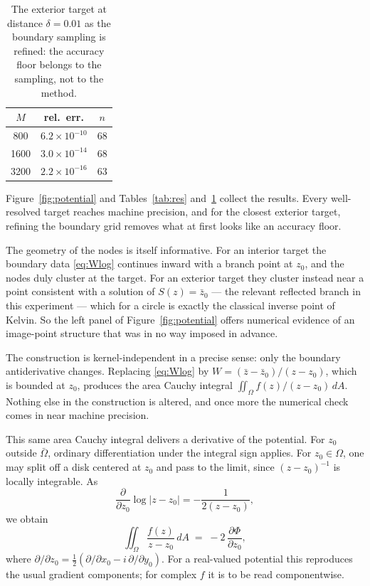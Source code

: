 \documentclass[onefignum,onetabnum]{siamart220329}
\newcommand{\dA}{\,dA}
\begin{document}
\begin{table}[t]
\centering
\caption{The exterior target at distance $\delta = 0.01$ as the
boundary sampling is refined: the accuracy floor belongs to the
sampling, not to the method.}
\label{tab:resM}
\begin{tabular}{ccc}
\toprule
$M$ & rel.\ err. & $n$\\
\midrule
800  & $6.2\times 10^{-10}$ & 68\\
1600 & $3.0\times 10^{-14}$ & 68\\
3200 & $2.2\times 10^{-16}$ & 63\\
\bottomrule
\end{tabular}
\end{table}

Figure~\ref{fig:potential} and Tables~\ref{tab:res} and~\ref{tab:resM}
collect the results. Every well-resolved target reaches machine
precision, and for the closest exterior target, refining the boundary
grid removes what at first looks like an accuracy floor.

The geometry of the nodes is itself informative. For an interior target
the boundary data \eqref{eq:Wlog} continues inward with a branch point
at $z_0$, and the nodes duly cluster at the target. For an exterior
target they cluster instead near a point consistent with a solution of
$S(z)=\bar z_0$ --- the relevant reflected branch in this experiment ---
which for a circle is exactly the classical inverse point of Kelvin. So
the left panel of Figure~\ref{fig:potential} offers numerical evidence
of an image-point structure that was in no way imposed in advance.

The construction is kernel-independent in a precise sense: only the
boundary antiderivative changes. Replacing \eqref{eq:Wlog} by
$W = (\bar z - \bar z_0)/(z - z_0)$, which is bounded at $z_0$, produces
the area Cauchy integral $\iint_\Omega f(z)/(z - z_0) \dA$. Nothing else
in the construction is altered, and once more the numerical check comes
in near machine precision.

This same area Cauchy integral delivers a derivative of the potential.
For $z_0$ outside $\bar\Omega$, ordinary differentiation under the
integral sign applies. For $z_0\in\Omega$, one may split off a disk
centered at $z_0$ and pass to the limit, since $(z-z_0)^{-1}$ is locally
integrable. As
\[
  \frac{\partial}{\partial z_0}\log|z-z_0|
  =-\frac{1}{2(z-z_0)},
\]
we obtain
\[
\iint_\Omega \frac{f(z)}{z - z_0} \dA \;=\;
-2\, \frac{\partial \Phi}{\partial z_0} ,
\]
where $\partial/\partial z_0 = \tfrac12(\partial/
\partial x_0-i\,\partial/\partial y_0)$. For a real-valued potential
this reproduces the usual gradient components; for complex $f$ it is to
be read componentwise.
\end{document}
